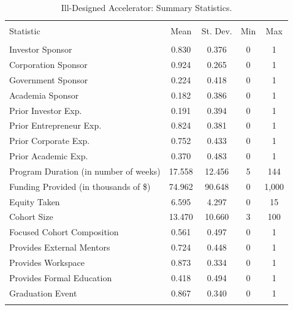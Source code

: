 \documentclass[
  12pt,
]{article}
\begin{document}
\begin{minipage}{0.48\textwidth}

\begin{table}[H] \centering 
  \caption{Ill-Designed Accelerator: Summary Statistics.} 
  \label{tab:illdesigneddf} 
\tiny 
\begin{tabular}{@{\extracolsep{1pt}}lcccc} 
\\[-1.8ex]\hline 
\hline \\[-1.8ex] 
Statistic & \multicolumn{1}{c}{Mean} & \multicolumn{1}{c}{St. Dev.} & \multicolumn{1}{c}{Min} & \multicolumn{1}{c}{Max} \\ 
\hline \\[-1.8ex] 
Investor Sponsor & 0.830 & 0.376 & 0 & 1 \\ 
Corporation Sponsor & 0.924 & 0.265 & 0 & 1 \\ 
Government Sponsor & 0.224 & 0.418 & 0 & 1 \\ 
Academia Sponsor & 0.182 & 0.386 & 0 & 1 \\ 
Prior Investor Exp. & 0.191 & 0.394 & 0 & 1 \\ 
Prior Entrepreneur Exp. & 0.824 & 0.381 & 0 & 1 \\ 
Prior Corporate Exp. & 0.752 & 0.433 & 0 & 1 \\ 
Prior Academic Exp. & 0.370 & 0.483 & 0 & 1 \\ 
Program Duration (in number of weeks) & 17.558 & 12.456 & 5 & 144 \\ 
Funding Provided (in thousands of \$) & 74.962 & 90.648 & 0 & 1,000 \\ 
Equity Taken & 6.595 & 4.297 & 0 & 15 \\ 
Cohort Size & 13.470 & 10.660 & 3 & 100 \\ 
Focused Cohort Composition & 0.561 & 0.497 & 0 & 1 \\ 
Provides External Mentors & 0.724 & 0.448 & 0 & 1 \\ 
Provides Workspace & 0.873 & 0.334 & 0 & 1 \\ 
Provides Formal Education & 0.418 & 0.494 & 0 & 1 \\ 
Graduation Event & 0.867 & 0.340 & 0 & 1 \\ 
\hline \\[-1.8ex] 
\end{tabular} 
\end{table} 
\end{minipage}
\qquad
\end{document}
